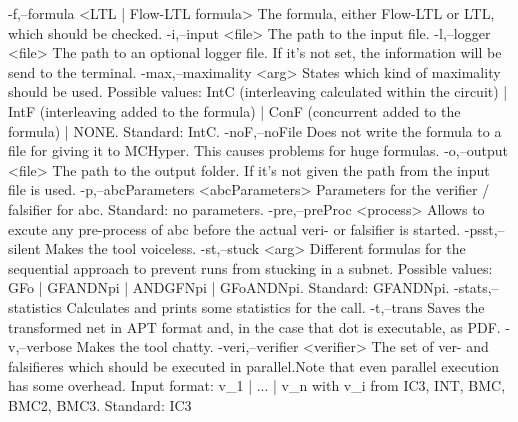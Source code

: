  -f,--formula <LTL | Flow-LTL formula>   The formula, either Flow-LTL or
                                         LTL, which should be checked.
 -i,--input <file>                       The path to the input file.
 -l,--logger <file>                      The path to an optional logger
                                         file. If it's not set, the
                                         information will be send to the
                                         terminal.
 -max,--maximality <arg>                 States which kind of maximality
                                         should be used. Possible values:
                                         IntC (interleaving calculated
                                         within the circuit)  | IntF
                                         (interleaving added to the
                                         formula)  | ConF (concurrent
                                         added to the formula)  | NONE.
                                         Standard: IntC.
 -noF,--noFile                           Does not write the formula to a
                                         file for giving it to MCHyper.
                                         This causes problems for huge
                                         formulas.
 -o,--output <file>                      The path to the output folder. If
                                         it's not given the path from the
                                         input file is used.
 -p,--abcParameters <abcParameters>      Parameters for the verifier /
                                         falsifier for abc. Standard: no
                                         parameters.
 -pre,--preProc <process>                Allows to excute any pre-process
                                         of abc before the actual veri- or
                                         falsifier is started.
 -psst,--silent                          Makes the tool voiceless.
 -st,--stuck <arg>                       Different formulas for the
                                         sequential approach to prevent
                                         runs from stucking in a subnet.
                                         Possible values: GFo | GFANDNpi |
                                         ANDGFNpi | GFoANDNpi. Standard:
                                         GFANDNpi.
 -stats,--statistics                     Calculates and prints some
                                         statistics for the call.
 -t,--trans                              Saves the transformed net in APT
                                         format and, in the case that dot
                                         is executable, as PDF.
 -v,--verbose                            Makes the tool chatty.
 -veri,--verifier <verifier>             The set of ver- and falsifieres
                                         which should be executed in
                                         parallel.Note that even parallel
                                         execution has some overhead.
                                         Input format: v_1 | ... | v_n
                                         with v_i from {IC3, INT, BMC,
                                         BMC2, BMC3}. Standard: IC3
